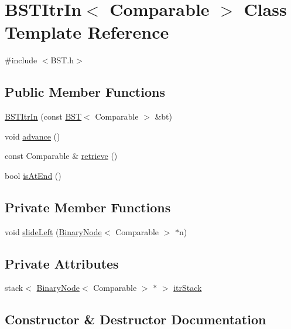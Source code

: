 \hypertarget{classBSTItrIn}{}\section{B\+S\+T\+Itr\+In$<$ Comparable $>$ Class Template Reference}
\label{classBSTItrIn}


{\ttfamily \#include $<$B\+S\+T.\+h$>$}

\subsection*{Public Member Functions}
\begin{DoxyCompactItemize}
\item 
\hyperlink{classBSTItrIn_ac836e2f560fed9cc7ef8e5431a2836cc}{B\+S\+T\+Itr\+In} (const \hyperlink{classBST}{B\+ST}$<$ Comparable $>$ \&bt)
\item 
void \hyperlink{classBSTItrIn_ac772d3ebbac748c5f8cf9bc659f2e32c}{advance} ()
\item 
const Comparable \& \hyperlink{classBSTItrIn_a434375a2d263bf132ab3c4ac878af8ef}{retrieve} ()
\item 
bool \hyperlink{classBSTItrIn_a6f9a43217862c263a9bf15b9a08b889a}{is\+At\+End} ()
\end{DoxyCompactItemize}
\subsection*{Private Member Functions}
\begin{DoxyCompactItemize}
\item 
void \hyperlink{classBSTItrIn_a896191c02da37364153df2363ff28e7e}{slide\+Left} (\hyperlink{classBinaryNode}{Binary\+Node}$<$ Comparable $>$ $\ast$n)
\end{DoxyCompactItemize}
\subsection*{Private Attributes}
\begin{DoxyCompactItemize}
\item 
stack$<$ \hyperlink{classBinaryNode}{Binary\+Node}$<$ Comparable $>$ $\ast$ $>$ \hyperlink{classBSTItrIn_ad7cb5e89f04cf08f5615aa53614dd916}{itr\+Stack}
\end{DoxyCompactItemize}


\subsection{Constructor \& Destructor Documentation}
\mbox{\label{classBSTItrIn_ac836e2f560fed9cc7ef8e5431a2836cc}} 
